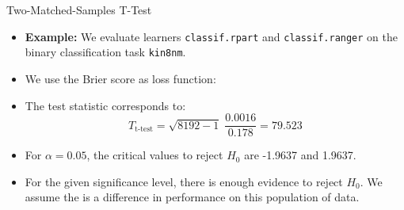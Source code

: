 \documentclass[11pt,compress,t,notes=noshow, aspectratio=169, xcolor=table]{beamer}
\begin{document}

\begin{frame}{Two-Matched-Samples T-Test}
\begin{itemize}
    \item \textbf{Example:} We evaluate learners \texttt{classif.rpart} and \texttt{classif.ranger} on the binary classification task \texttt{kin8nm}.
    \item We use the Brier score as loss function:
    {
        \scriptsize
        
    }
    \item The test statistic corresponds to:
    $$
    T_{\text{t-test}} = \sqrt{8192 - 1} \; \frac{0.0016}{0.178} = 79.523
    $$
    \item For $\alpha = 0.05$, the critical values to reject $H_0$ are -1.9637 and 1.9637.
    \item For the given significance level, there is enough evidence to reject $H_0$. We assume the is a difference in performance on this population of data.
\end{itemize}


\end{frame}
\end{document}
